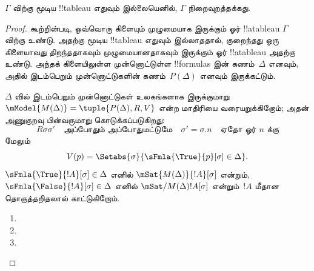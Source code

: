 \documentclass[../../../include/open-logic-section]{subfiles}
\begin{document}
\begin{thm}[நிறைவுத்தன்மை]
  $\Gamma$ விற்கு மூடிய !!{tableau} எதுவும் இல்லையெனில், $\Gamma$
  நிறைவுறத்தக்கது.
\end{thm}

\begin{proof}
கூற்றின்படி, ஒவ்வொரு கிளையும் முழுமையாக இருக்கும் ஓர் !!a{tableau}
$\Gamma$ விற்கு உண்டு. அதற்கு மூடிய !!{tableau} எதுவும் இல்லாததால்,
குறைந்தது ஒரு கிளையாவது திறந்ததாகவும் முழுமையானதாகவும் இருக்கும் ஓர்
!!a{tableau} அதற்கு உண்டு. அந்தக் கிளையிலுள்ள முன்னொட்டுள்ள !!{formula}s இன்
கணம்~$\Delta$ எனவும், அதில் இடம்பெறும் முன்னொட்டுகளின் கணம்~$P(\Delta)$
எனவும் இருக்கட்டும்.

$\Delta$ வில் இடம்பெறும் முன்னொட்டுகள் உலகங்களாக இருக்குமாறு
$\mModel{M(\Delta)} = \tuple{P(\Delta), R, V}$ என்ற மாதிரியை
வரையறுக்கிறோம்; அதன் அணுகுறவு பின்வருமாறு கொடுக்கப்படுகிறது:
\[
R\sigma\sigma' \quad \text{அப்போதும் அப்போதுமட்டுமே} \quad
\sigma'=\sigma.n \quad \text{ஏதோ ஓர்~$n$ க்கு}
\]
மேலும்
\[
V(p) = \Setabs{\sigma}{\sFmla{\True}{p}[\sigma] \in \Delta}.
\]
$\sFmla{\True}{!A}[\sigma] \in \Delta$ எனில்
$\mSat{M(\Delta)}{!A}[\sigma]$ என்றும்,
$\sFmla{\False}{!A}[\sigma] \in \Delta$ எனில்
$\mSat/{M(\Delta)}{!A}[\sigma]$ என்றும்~$!A$ மீதான தொகுத்தறிதலால்
காட்டுகிறோம்.

\begin{enumerate}
  \item {}
  \item {}
  \item {}
\end{enumerate}
\end{proof}
\end{document}
